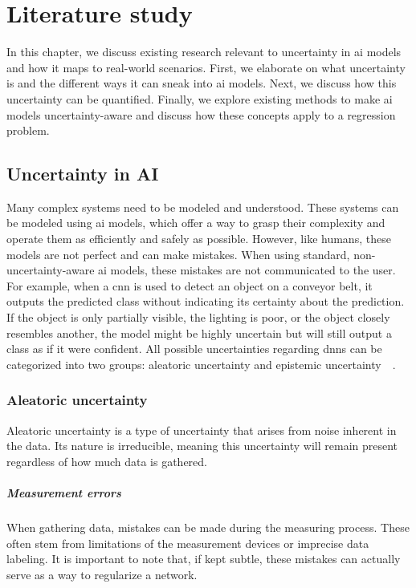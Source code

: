
\chapter{Literature study}\label{ch:literature-study}
In this chapter, we discuss existing research relevant to uncertainty in \gls{ai} models and how it maps to real-world scenarios.
First, we elaborate on what uncertainty is and the different ways it can sneak into \gls{ai} models.
Next, we discuss how this uncertainty can be quantified.
Finally, we explore existing methods to make \gls{ai} models uncertainty-aware and discuss how these concepts apply to a regression problem.

\section{Uncertainty in AI} \label{ch:literature-study_section:uncertainty-in-ai}
Many complex systems need to be modeled and understood.
These systems can be modeled using \gls{ai} models, which offer a way to grasp their complexity and operate them as efficiently and safely as possible.
However, like humans, these models are not perfect and can make mistakes.
When using standard, non-uncertainty-aware \gls{ai} models, these mistakes are not communicated to the user.
For example, when a \gls{cnn} is used to detect an object on a conveyor belt, it outputs the predicted class without indicating its certainty about the prediction.
If the object is only partially visible, the lighting is poor, or the object closely resembles another, the model might be highly uncertain but will still output a class as if it were confident.
All possible uncertainties regarding \glspl{dnn} can be categorized into two groups: aleatoric uncertainty and epistemic uncertainty~\cite{src:survey-uncertainty-dnn}~\cite{src:scalable-bayesian-deep-learning}.

\subsection{Aleatoric uncertainty}\label{ch:literature-study_section:uncertainty-in-ai_subsection:aleatoric-uncertainty}
Aleatoric uncertainty is a type of uncertainty that arises from noise inherent in the data.
Its nature is irreducible, meaning this uncertainty will remain present regardless of how much data is gathered.

\paragraph{Measurement errors}\label{ch:literature-study_section:uncertainty-in-ai_paragraph:measurement-errors}
When gathering data, mistakes can be made during the measuring process.
These often stem from limitations of the measurement devices or imprecise data labeling.
It is important to note that, if kept subtle, these mistakes can actually serve as a way to regularize a network.

